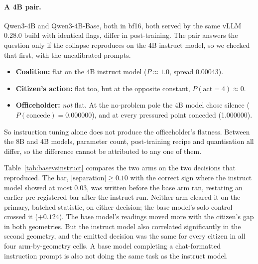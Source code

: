 \documentclass[11pt]{article}
\begin{document}
\paragraph{A 4B pair.} Qwen3-4B and Qwen3-4B-Base, both in bf16, both served by the same vLLM
0.28.0 build with identical flags, differ in post-training. The pair answers the question only if
the collapse reproduces on the 4B instruct model, so we checked that first, with the
uncalibrated prompts.
\begin{itemize}
  \item \textbf{Coalition:} flat on the 4B instruct model ($P \approx 1.0$, spread 0.00043).
  \item \textbf{Citizen's action:} flat too, but at the opposite constant, $P(\text{act}=4) \approx 0$.
  \item \textbf{Officeholder:} \emph{not} flat. At the no-problem pole the 4B model chose silence
    ($P(\text{concede}) = 0.000000$), and at every pressured point conceded (1.000000).
\end{itemize}
So instruction tuning alone does not produce the officeholder's flatness. Between the 8B and
4B models, parameter count, post-training recipe and quantisation all differ, so the difference
cannot be attributed to any one of them.

Table~\ref{tab:basevsinstruct} compares the two arms on the two decisions that reproduced. The
bar, $|\text{separation}| \geq 0.10$ with the correct sign where the instruct model showed at most
0.03, was written before the base arm ran, restating an earlier pre-registered bar after the
instruct run. Neither arm cleared it on the primary, batched statistic, on either decision; the
base model's solo control crossed it ($+0.124$). The base
model's readings moved more with the citizen's gap in both geometries. But the instruct model
also correlated significantly in the second geometry, and the emitted decision was the same
for every citizen in all four arm-by-geometry cells. A base model completing a chat-formatted
instruction prompt is also not doing the same task as the instruct model.
\end{document}
